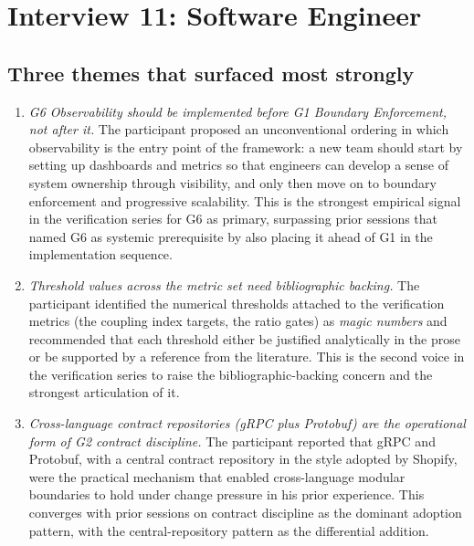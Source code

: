 
\section{Interview 11: Software Engineer}
\label{sec:interview11}

\subsection*{Three themes that surfaced most strongly}

\begin{enumerate}[itemsep=8pt,topsep=2pt]
  \item \emph{G6 Observability should be implemented before G1 Boundary Enforcement, not after it.} The participant proposed an unconventional ordering in which observability is the entry point of the framework: a new team should start by setting up dashboards and metrics so that engineers can develop a sense of system ownership through visibility, and only then move on to boundary enforcement and progressive scalability. This is the strongest empirical signal in the verification series for G6 as primary, surpassing prior sessions that named G6 as systemic prerequisite by also placing it ahead of G1 in the implementation sequence.

  \item \emph{Threshold values across the metric set need bibliographic backing.} The participant identified the numerical thresholds attached to the verification metrics (the coupling index targets, the ratio gates) as \emph{magic numbers} and recommended that each threshold either be justified analytically in the prose or be supported by a reference from the literature. This is the second voice in the verification series to raise the bibliographic-backing concern and the strongest articulation of it.

  \item \emph{Cross-language contract repositories (gRPC plus Protobuf) are the operational form of G2 contract discipline.} The participant reported that gRPC and Protobuf, with a central contract repository in the style adopted by Shopify, were the practical mechanism that enabled cross-language modular boundaries to hold under change pressure in his prior experience. This converges with prior sessions on contract discipline as the dominant adoption pattern, with the central-repository pattern as the differential addition.
\end{enumerate}

